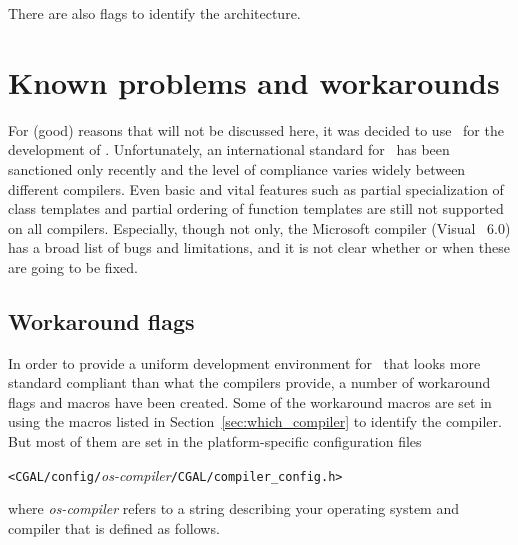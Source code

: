 \noindent There are also flags to identify the architecture.

\vspace{5mm}\vspace{5mm}

\section{Known problems and workarounds}
\label{sec:problems_and_workarounds}

For (good) reasons that will not be discussed here, it was decided to
use \CC\ for the development of \cgal. Unfortunately, an international
standard for \CC\ has been sanctioned only recently
\cite{ansi-is14882pl98} and the level of compliance varies widely
between different compilers. 
Even basic and vital features such as
partial specialization of class templates and partial ordering of
function templates are still not supported on all compilers.
Especially, though not only, the Microsoft compiler (Visual \CC\ 6.0)
has a broad list of bugs and limitations, and it is not clear whether
or when these are going to be fixed.

\subsection{Workaround flags}
\label{sec:workaround_flags}

In order to provide a uniform development environment for \cgal\ that
looks more standard compliant than what the compilers provide, a number
of workaround flags and macros have been created.  Some of the
workaround macros are set in 
using the macros 
listed in Section~\ref{sec:which_compiler} to identify the compiler. 
But most of them are set in the platform-specific configuration files
\begin{center}
\texttt{<CGAL/config/}{\em os-compiler}\texttt{/CGAL/compiler\_config.h>}
\end{center}
where \textit{os-compiler} refers to a string describing your
operating system and compiler that is defined as follows.

